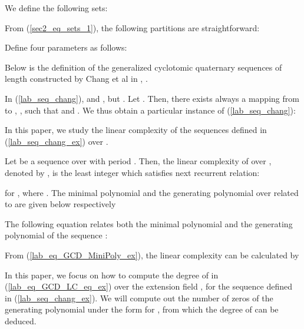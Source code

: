 \documentclass{mcom-l}
\theoremstyle{definition}
\numberwithin{equation}{section}
\begin{document}
 
 We define the following sets:
 
 From (\ref{sec2_eq_sets_1}), the following partitions are straightforward:
 
 
 Define four parameters as follows:
 
 
 Below is the definition of the generalized cyclotomic quaternary sequences of length  constructed by Chang et al in \cite{B13},  .
   
   In (\ref{lab_seq_chang}),  and , but . Let . Then, there exists always a  mapping from  to , , such that  and .  We thus obtain a particular instance of (\ref{lab_seq_chang}):
   
    In this paper, we study the linear complexity of the sequences defined in (\ref{lab_seq_chang_ex}) over .
    
     Let  be a sequence over  with period . Then, the linear complexity of  over , denoted by , is the least integer  which satisfies next recurrent relation:
      
    for , where .
    The minimal polynomial and the generating polynomial over  
    related to  are given below respectively
    
    The following equation relates both the minimal polynomial and the generating polynomial of the sequence :
    
    From (\ref{lab_eq_GCD_MiniPoly_ex}), the linear complexity can be calculated by
    
    
    In this paper, we focus on how to compute the degree of  in (\ref{lab_eq_GCD_LC_eq_ex}) over the extension field ,  for the sequence defined in (\ref{lab_seq_chang_ex}). We will compute out the number of zeros of the generating polynomial   under the form  for , from which  the degree of  can be deduced.
    
\end{document}
